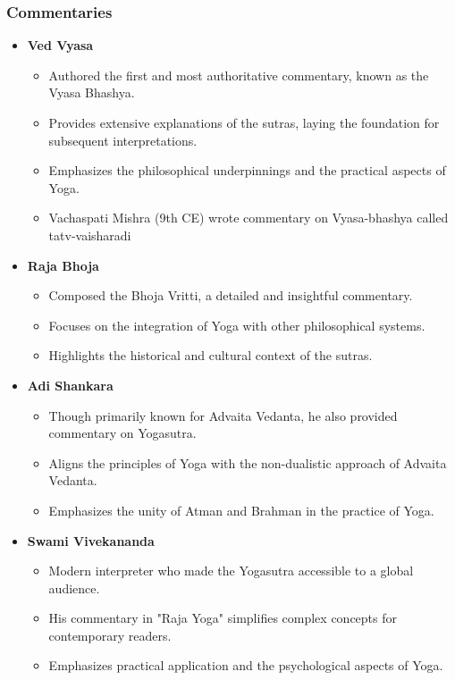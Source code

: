 \begin{frame}[fragile]\frametitle{Commentaries}
    
    \begin{itemize}
        \item \textbf{Ved Vyasa}
        \begin{itemize}
            \item Authored the first and most authoritative commentary, known as the Vyasa Bhashya.
            \item Provides extensive explanations of the sutras, laying the foundation for subsequent interpretations.
            \item Emphasizes the philosophical underpinnings and the practical aspects of Yoga.
			\item Vachaspati Mishra (9th CE) wrote commentary on Vyasa-bhashya called tatv-vaisharadi
        \end{itemize}
        
        \item \textbf{Raja Bhoja}
        \begin{itemize}
            \item Composed the Bhoja Vritti, a detailed and insightful commentary.
            \item Focuses on the integration of Yoga with other philosophical systems.
            \item Highlights the historical and cultural context of the sutras.
        \end{itemize}
        
        \item \textbf{Adi Shankara}
        \begin{itemize}
            \item Though primarily known for Advaita Vedanta, he also provided commentary on Yogasutra.
            \item Aligns the principles of Yoga with the non-dualistic approach of Advaita Vedanta.
            \item Emphasizes the unity of Atman and Brahman in the practice of Yoga.
        \end{itemize}
        
        \item \textbf{Swami Vivekananda}
        \begin{itemize}
            \item Modern interpreter who made the Yogasutra accessible to a global audience.
            \item His commentary in "Raja Yoga" simplifies complex concepts for contemporary readers.
            \item Emphasizes practical application and the psychological aspects of Yoga.
        \end{itemize}
    \end{itemize}
    
\end{frame}


